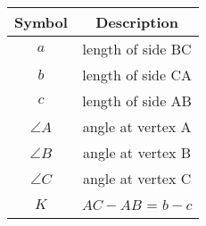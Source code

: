 
\begin{tabular}[12pt]{ |c|c|}
    \hline
    \textbf{Symbol} & \textbf{Description} \\
    \hline
    \textbf{$a$} & length of side BC\\
    \hline
    \textbf{$b$} & length of side CA\\
    \hline
    \textbf{$c$} & length of side AB\\
    \hline
    $\angle A$ & angle at vertex A\\
    \hline
    $\angle B$ & angle at vertex B\\
    \hline
    $\angle C$ & angle at vertex C\\
    \hline
    \textbf{$K$} & $AC - AB$ = $b-c$\\ 
    \hline
    \end{tabular}
   